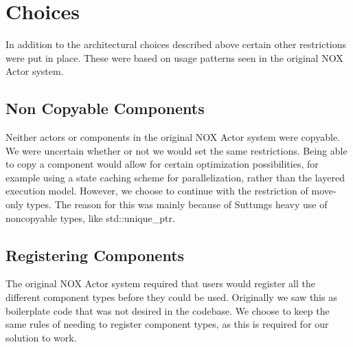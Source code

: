 \section{Choices}
In addition to the architectural choices described above certain other restrictions
were put in place.
These were based on usage patterns seen in the original NOX Actor system.

\subsection{Non Copyable Components}
Neither actors or components in the original NOX Actor system were copyable.
We were uncertain whether or not we would set the same restrictions.
Being able to copy a component would allow for certain optimization possibilities,
for example using a state caching scheme\cite[p. 930]{game_engine_architecture} for parallelization,
rather than the layered execution model.
However, we choose to continue with the restriction of move-only types.
The reason for this was mainly because of Suttungs heavy use of noncopyable types,
like std::unique\_ptr.

\subsection{Registering Components}
The original NOX Actor system required that users would register all the different component types before they could be used.
Originally we saw this as boilerplate code that was not desired in the codebase.
We choose to keep the same rules of needing to register component types, as this is required for our solution to work.

